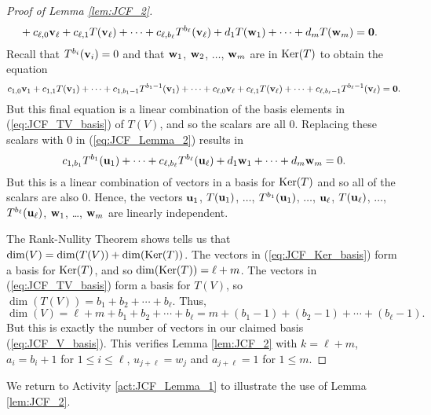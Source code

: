 \begin{proof}[Proof of Lemma \ref{lem:JCF_2}]
\begin{align*}
	&+ c_{\ell,0}\mathbf{v}_{\ell} +  c_{\ell,1}T(\mathbf{v}_{\ell})+ \cdots + c_{\ell,b_{\ell}}T^{b_{\ell}}(\mathbf{v}_{\ell}) +  d_1T(\mathbf{w}_1)+  \cdots +  d_mT(\mathbf{w}_m) = \mathbf{0}.
\end{align*}
Recall that $T^{b_i}(\mathbf{v}_i) = 0$ and that $\mathbf{w}_1$, $\mathbf{w}_2$, $\ldots$, $\mathbf{w}_m$ are in $\text{Ker}(T)$ to obtain the equation
\[c_{1,0}\mathbf{v}_1+c_{1,1}T(\mathbf{v}_1)+ \cdots + c_{1,b_1-1}T^{b_1-1}(\mathbf{v}_1) +  \cdots + c_{\ell,0}\mathbf{v}_{\ell} +  c_{\ell,1}T(\mathbf{v}_{\ell})+ \cdots + c_{\ell,b_{\ell}-1}T^{b_{\ell}-1}(\mathbf{v}_{\ell}) = \mathbf{0}.\]
But this final equation is a linear combination of the basis elements in (\ref{eq:JCF_TV_basis}) of $T(V)$, and so the scalars are all $0$. Replacing these scalars with $0$ in (\ref{eq:JCF_Lemma_2}) results in 
\[c_{1,b_1}T^{b_1}(\mathbf{u}_1) +  \cdots + c_{\ell,b_{\ell}}T^{b_{\ell}}(\mathbf{u}_{\ell}) +  d_1\mathbf{w}_1+  \cdots +  d_m\mathbf{w}_m = 0.\]
But this is a linear combination of vectors in a basis for $\text{Ker}(T)$ and so all of the scalars are also $0$. Hence, the vectors $\mathbf{u}_1$, $T(\mathbf{u}_1)$, $\ldots$, $T^{b_1}(\mathbf{u}_1)$, $\ldots$, $\mathbf{u}_{\ell}$, $T(\mathbf{u}_{\ell})$, $\ldots$, $T^{b_{\ell}}(\mathbf{u}_{\ell})$, $\mathbf{w}_1$, \ldots, $\mathbf{w}_m$ are linearly independent.  

The Rank-Nullity Theorem shows tells us that $\dim(V) = \dim(T(V)) + \dim(\text{Ker}(T))$. The vectors in (\ref{eq:JCF_Ker_basis}) form a basis for $\text{Ker}(T)$, and so $\dim(\text{Ker}(T)) = \ell + m$. The vectors in (\ref{eq:JCF_TV_basis}) form a basis for $T(V)$, so $\dim(T(V)) = b_1+b_2+ \cdots + b_{\ell}$. Thus, 
\[\dim(V) = \ell+m + b_1+b_2+ \cdots + b_{\ell} = m + (b_1-1) + (b_2-1) + \cdots + (b_{\ell}-1).\]
But this is exactly the number of vectors in our claimed basis (\ref{eq:JCF_V_basis}). This verifies Lemma \ref{lem:JCF_2} with $k=\ell+m$, $a_i=b_i+1$ for $1 \leq i \leq \ell$, $u_{j+\ell} = w_j$ and $a_{j+\ell} = 1$ for $1 \leq m$. 
\end{proof}

We return to Activity \ref{act:JCF_Lemma_1} to illustrate the use of Lemma \ref{lem:JCF_2}. 

